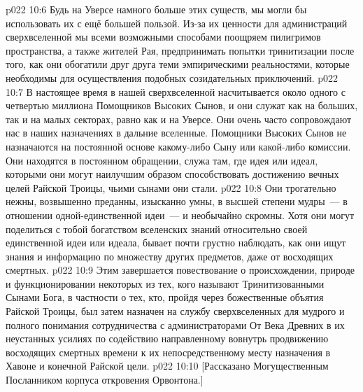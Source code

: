 \vs p022 10:6 Будь на Уверсе намного больше этих существ, мы могли бы использовать их с ещё большей пользой. Из\hyp{}за их ценности для администраций сверхвселенной мы всеми возможными способами поощряем пилигримов пространства, а также жителей Рая, предпринимать попытки тринитизации после того, как они обогатили друг друга теми эмпирическими реальностями, которые необходимы для осуществления подобных созидательных приключений.
\vs p022 10:7 \pc В настоящее время в нашей сверхвселенной насчитывается около одного с четвертью миллиона Помощников Высоких Сынов, и они служат как на больших, так и на малых секторах, равно как и на Уверсе. Они очень часто сопровождают нас в наших назначениях в дальние вселенные. Помощники Высоких Сынов не назначаются на постоянной основе какому\hyp{}либо Сыну или какой\hyp{}либо комиссии. Они находятся в постоянном обращении, служа там, где идея или идеал, которыми они  могут наилучшим образом способствовать достижению вечных целей Райской Троицы, чьими сынами они стали.
\vs p022 10:8 Они трогательно нежны, возвышенно преданны, изысканно умны, в высшей степени мудры~--- в отношении одной\hyp{}единственной идеи~--- и необычайно скромны. Хотя они могут поделиться с тобой богатством вселенских знаний относительно своей единственной идеи или идеала, бывает почти грустно наблюдать, как они ищут знания и информацию по множеству других предметов, даже от восходящих смертных.
\vs p022 10:9 \pc Этим завершается повествование о происхождении, природе и функционировании некоторых из тех, кого называют Тринитизованными Сынами Бога, в частности о тех, кто, пройдя через божественные объятия Райской Троицы, был затем назначен на службу сверхвселенных для мудрого и полного понимания сотрудничества с администраторами От Века Древних в их неустанных усилиях по содействию направленному вовнутрь продвижению восходящих смертных времени к их непосредственному месту назначения в Хавоне и конечной Райской цели.
\vsetoff
\vs p022 10:10 [Рассказано Могущественным Посланником корпуса откровения Орвонтона.]
\quizlink
